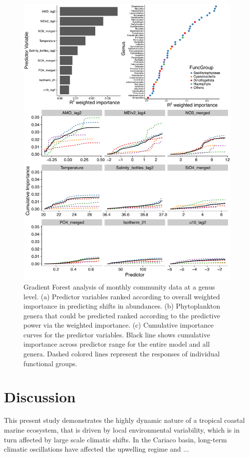 \documentclass[draft]{agujournal2019}
\begin{document}
\begin{figure}
\noindent\includegraphics[width=\textwidth]{fig/GF_output_plot3_new.pdf}
\caption{Gradient Forest analysis of monthly community data at a genus level. (a) Predictor variables ranked according to overall weighted importance in predicting shifts in abundances. (b) Phytoplankton genera that could be predicted ranked according to the predictive power via the weighted importance. (c) Cumulative importance curves for the predictor variables. Black line shows cumulative importance across predictor range for the entire model and all genera. Dashed colored lines represent the responses of individual functional groups.}
\label{fig:GF}
\end{figure}


\section{Discussion}
This present study demonstrates the highly dynamic nature of a tropical coastal marine ecosystem, that is driven by local environmental variability, which is in turn affected by large scale climatic shifts. In the Cariaco basin, long-term climatic oscillations have affected the upwelling regime and ...
\end{document}
